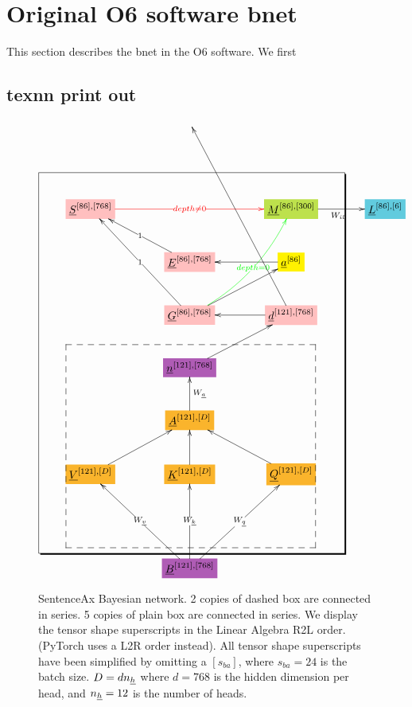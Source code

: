 \documentclass[12pt]{article}
\begin{document}
\section{Original O6 software bnet}

This section describes the bnet 
in the O6 software. We first

\subsection{texnn print out}
\begin{figure}[h!]\centering
$$\xymatrix@R=2.5pc@C=3.5pc{
&&&
\\
&&&
\\
*+[F*:pink]{\underline{S}^{[86], [768]}}\ar@[red][rr]|-{\color{red} depth\neq 0}&&*+[F*:SpringGreen]{\underline{M}^{[86], [300]}}\ar[r]_{W_{il}}&*+[F*:SkyBlue]{\underline{L}^{[86], [6]}}
\\
&*+[F*:pink]{\underline{E}^{[86], [768]}}\ar[ul]|-{1}&*+[F*:yellow]{\underline{a}^{[86]}}\ar[l]&
\\
&*+[F*:pink]{\underline{G}^{[86], [768]}}\ar[ur]\ar@[green]@/_1pc/[uur]|-{\color{green} depth=0}\ar[uul]|-{1}&*+[F*:pink]{\underline{d}^{[121], [768]}}\ar[uuuul]\ar[l]&
\\
&*+[F*:Orchid]{\underline{n}^{[121], [768]}}\ar[ur]&&
\\
&*+[F*:Dandelion]{\underline{A}^{[121], [D]}}\ar[u]_{W_\rva}&&
\\
*+[F*:Dandelion]{\underline{V}^{[121], [D]}}\ar[ur]&*+[F*:Dandelion]{\underline{K}^{[121], [D]}}\ar[u]&*+[F*:Dandelion]{\underline{Q}^{[121], [D]}}\ar[ul]&
\\
&&&
\\
&*+[F*:Orchid]{\underline{B}^{[121], [768]}}\ar[uu]|-{W_\rvk}\ar[uur]|-{W_\rvq}\ar[uul]|-{W_\rvv}&&
\save
\POS"3,1"."9,1"."3,3"."9,3"!C*+<4.8em>\frm{-,}
\POS"6,1"."9,1"."6,3"."9,3"!C*+<3.8em>\frm{--}
\restore
}$$
\caption{SentenceAx Bayesian network. 2 copies of dashed box are connected in series. 5 copies of plain box are connected in series. We display the tensor shape superscripts in the Linear Algebra R2L order. (PyTorch uses a L2R order instead). All tensor shape superscripts have been simplified by omitting a $[s_{ba}]$, where $s_{ba}=24$ is the batch size. $D= d n_{\underline{h}}$ where $d=768$ is the hidden dimension per head, and $n_{\underline{h}}=12$ is the number of heads. }
\label{fig-texnn-for-sentence-ax-o6-bnet}
\end{figure}
\end{document}
